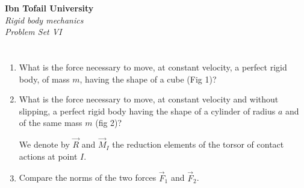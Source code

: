 \documentclass[12pt]{article}
\begin{document}
\begin{center}
\Large\textbf{Ibn Tofail University} \\[1em]
\large\textit{Rigid body mechanics} \\[2em]
\large\textit{Problem Set VI} \\[0.5em]
\end{center}

\vspace{1cm}

\section{}

\begin{enumerate}
    \item What is the force necessary to move, at constant velocity, a perfect rigid body, of mass $m$, having the shape of a cube (Fig 1)?
    \item What is the force necessary to move, at constant velocity and without slipping, a perfect rigid body having the shape of a cylinder of radius $a$ and of the same mass $m$ (fig 2)?
    
    We denote by $\vec{R}$ and $\vec{M}_I$ the reduction elements of the torsor of contact actions at point $I$.
    \item Compare the norms of the two forces $\vec{F}_1$ and $\vec{F}_2$.
\end{enumerate}
\end{document}
